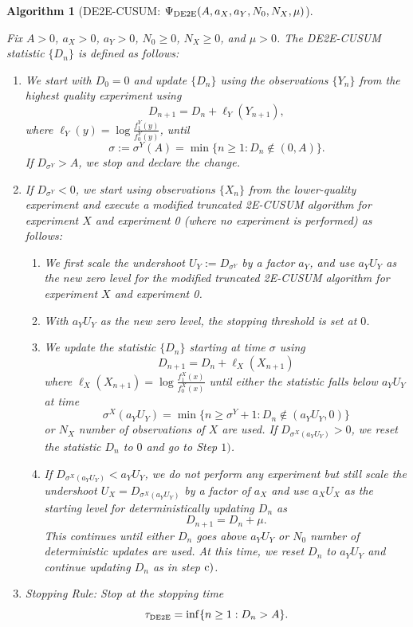\documentclass[journal, onecolumn]{IEEEtran}
\newtheorem{algorithm}{Algorithm}
\begin{document}
\begin{algorithm}[DE2E-CUSUM: $\Psi_{\textup{DE2E}} (A, a_X, a_Y, N_0, N_X, \mu)$]
\label{alg:de2e-cusum}

Fix $A > 0$, $a_X > 0$, $a_Y > 0$, $N_0 \geq 0$, $N_X \geq 0$, and $\mu > 0$. The \textup{DE2E-CUSUM} statistic $\{ D_n \}$ is defined as follows:

\begin{enumerate}
\item We start with $D_0 = 0$ and update $\{ D_n \}$ using the observations $\{ Y_n \}$ from the highest quality experiment using
$$ D_{n + 1}  = D_n + \ell_Y (Y_{n + 1}), $$
where $\ell_Y (y) = \log \frac{f_1^Y (y)}{f_0^Y (y)}$, until 
$$ \sigma := \sigma^Y (A) = \min \{ n \geq 1: D_n \notin (0, A) \}. $$
If $D_{\sigma^Y} > A$, we stop and declare the change.

\item If $D_{\sigma^Y} < 0$, we start using observations $\{ X_n \}$ from the lower-quality experiment and execute a modified truncated 2E-CUSUM algorithm for experiment $X$ and experiment 0 (where no experiment is performed) as follows:

    \begin{enumerate}
    \item We first scale the undershoot $U_Y:= D_{\sigma^Y}$ by a factor $a_Y$, and use $a_Y U_Y$ as the new zero level for the modified truncated \textup{2E-CUSUM} algorithm for experiment $X$ and experiment 0.
    
    \item With $a_Y U_Y$ as the new zero level, the stopping threshold is set at $0$.
    
    \item We update the statistic $\{ D_n \}$ starting at time $\sigma$ using
    $$ D_{n + 1} = D_n + \ell_X (X_{n + 1}) $$
    where $\ell_X (X_{n + 1}) = \log \frac{f_1^X (x)}{f_0^X (x)}$ until either the statistic falls below $a_Y U_Y$ at time
    $$ \sigma^X (a_Y U_Y) = \min \{ n \geq \sigma^Y + 1: D_n \not \in (a_Y U_Y, 0) \} $$
    or $N_X$ number of observations of $X$ are used. If $D_{\sigma^X (a_Y U_Y)} > 0$, we reset the statistic $D_n$ to $0$ and go to Step $1)$.
    
    \item If $D_{\sigma^X (a_Y U_Y)} < a_Y U_Y$, we do not perform any experiment but still scale the undershoot $U_X = D_{\sigma^X (a_Y U_Y)}$ by a factor of $a_X$ and use $a_X U_X$ as the starting level for deterministically updating $D_n$ as
    $$ D_{n + 1} = D_n + \mu. $$
    This continues until either $D_n$ goes above $a_Y U_Y$ or $N_0$ number of deterministic updates are used. At this time, we reset $D_n$ to $a_Y U_Y$ and continue updating $D_n$ as in step $\textup{c)}$.
    \end{enumerate}

\item Stopping Rule: Stop at the stopping time
$$ \tau_{\textup{\fontsize{6 pt}{10 pt}\selectfont DE2E}} = \inf \{ n \geq 1: D_n > A \}. $$
\end{enumerate}    
\end{algorithm}
\end{document}

